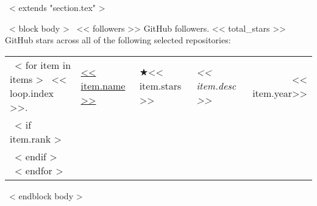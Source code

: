 ~< extends "section.tex" >~

~< block body >~
<< followers >> GitHub followers.
<< total_stars >> GitHub stars across all of the following selected repositories:
\setlength\tabcolsep{0pt}
\begin{longtable}{@{\extracolsep{\fill}} llllr}
  ~< for item in items >~
    << loop.index >>. & \href{<< item.repo_url >>}{<< item.name >>} & $\bigstar$<< item.stars >> & \emph{<< item.desc >>} & << item.year>> \\
    ~< if item.rank >~
     & \multicolumn{4}{l}{\scriptsize \color{gray}{Rank \#<< item.rank >> among all contributors with << item.commits >> commits, << item.additons >> lines of additions and << item.deletions >> lines of deletions}} \\
    ~< endif >~
  ~< endfor >~
\end{longtable}
\vspace{0em}
~< endblock body >~
